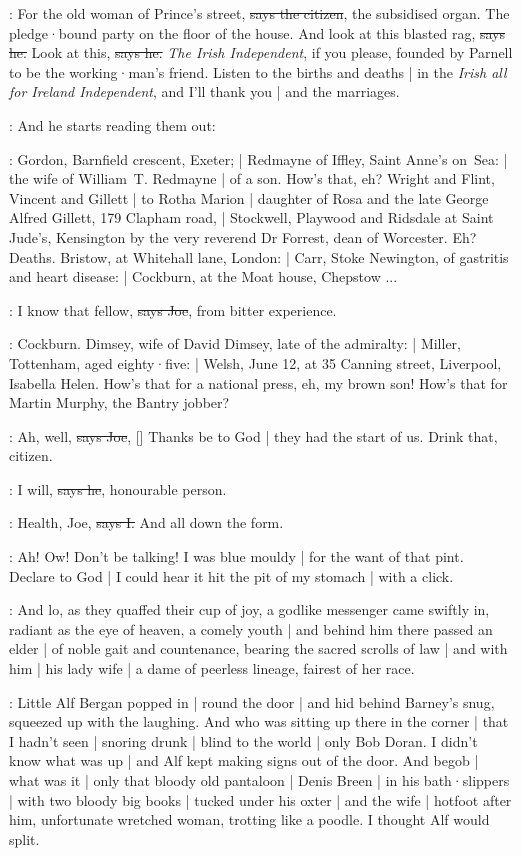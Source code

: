 \citizen:
For the old woman of Prince's street,
\sout{says the citizen},
the subsidised organ.
The pledge·bound party on the floor of the house.
And look at this blasted rag,
\sout{says he.}
%
Look at this,
\sout{says he.}
\emph{The Irish Independent},
if you please,
founded by Parnell to be the working·man's friend.
Listen to the births and deaths |
in the \emph{Irish all for Ireland Independent},
and I'll thank you |
and the marriages.

\Nq:
And he starts reading them out:

\citizen:
Gordon,
Barnfield crescent,
Exeter; |
Redmayne of Iffley,
Saint Anne's on~Sea: |
the wife of William~T. Redmayne |
of a son.
How's that,
eh?
Wright and Flint,
Vincent and Gillett |
to Rotha Marion |
daughter of Rosa and the late George Alfred Gillett,
179 Clapham road, |
Stockwell, Playwood and Ridsdale at Saint Jude's,
Kensington by the very reverend Dr Forrest,
dean of Worcester.
Eh?
Deaths.
Bristow,
at Whitehall lane,
London: |
Carr,
Stoke Newington,
of gastritis and heart disease: |
Cockburn,
at the Moat house,
Chepstow ...

\joe:
I know that fellow,
\sout{says Joe},
from bitter experience.

\citizen:
Cockburn.
Dimsey,
wife of David Dimsey,
late of the admiralty: |
Miller,
Tottenham,
aged eighty·five: |
Welsh,
June 12,
at 35 Canning street,
Liverpool,
Isabella Helen.
How's that for a national press,
eh,
my brown son!
How's that for Martin Murphy,
the Bantry jobber?

\joe:
Ah, well,
\sout{says Joe},
[]
Thanks be to God |
they had the start of us.
Drink that,
citizen.

\citizen:
I will,
\sout{says he},
honourable person.

:
Health,
Joe,
\sout{says I.}
And all down the form.

\Nq:
Ah!
Ow!
Don't be talking!
I was blue mouldy |
for the want of that pint.
Declare to God |
I could hear it hit the pit of my stomach |
with a click.

:
And lo,
as they quaffed their cup of joy,
a godlike messenger came swiftly in,
radiant as the eye of heaven,
a comely youth |
and behind him
there passed an elder |
of noble gait and countenance,
bearing the sacred scrolls of law |
and with him |
his lady wife |
a dame of peerless lineage,
fairest of her race.

\Nq:
Little Alf Bergan popped in |
round the door |
and hid behind Barney's snug,
squeezed up with the laughing.
And who was sitting up there in the corner |
that I hadn't seen |
snoring drunk |
blind to the world |
only Bob Doran.
I didn't know what was up |
and Alf kept making signs out of the door.
And begob |
what was it |
only that bloody old pantaloon |
Denis Breen |
in his bath·slippers |
with two bloody big books |
tucked under his oxter |
and the wife |
hotfoot after him,
unfortunate wretched woman,
trotting like a poodle.
I thought Alf would split.

